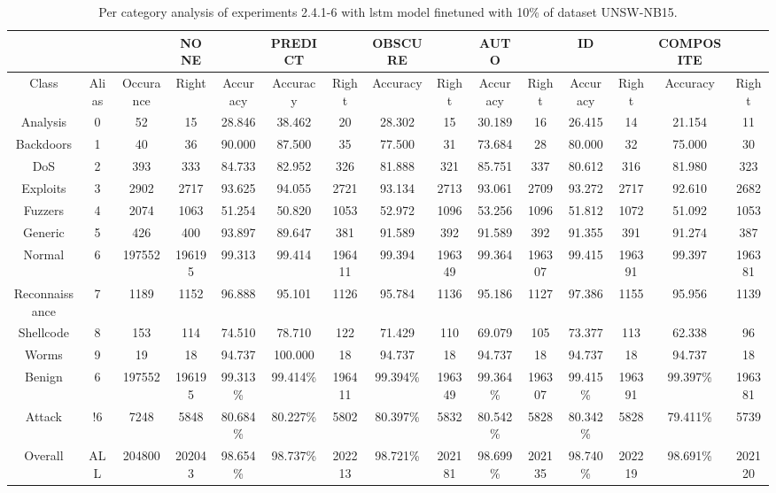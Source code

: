 \begin{table}[htb]
    \centering
    \begin{tabular}{@{}ccccccccccccccc@{}}
        \toprule
         &  &  & NONE &  & PREDICT &  & OBSCURE &  & AUTO &  & ID &  & COMPOSITE &  \\
        \midrule
        Class &  Alias &  Occurance &  Right &  Accuracy &  Accuracy &  Right &  Accuracy &  Right &  Accuracy &  Right &  Accuracy &  Right &  Accuracy &  Right \\
        Analysis &  0 &  52 &  15 &  28.846 &  38.462 &  20 &  28.302 &  15 &  30.189 &  16 &  26.415 &  14 &  21.154 &  11 \\
        Backdoors &  1 &  40 &  36 &  90.000 &  87.500 &  35 &  77.500 &  31 &  73.684 &  28 &  80.000 &  32 &  75.000 &  30 \\
        DoS &  2 &  393 &  333 &  84.733 &  82.952 &  326 &  81.888 &  321 &  85.751 &  337 &  80.612 &  316 &  81.980 &  323 \\
        Exploits &  3 &  2902 &  2717 &  93.625 &  94.055 &  2721 &  93.134 &  2713 &  93.061 &  2709 &  93.272 &  2717 &  92.610 &  2682 \\
        Fuzzers &  4 &  2074 &  1063 &  51.254 &  50.820 &  1053 &  52.972 &  1096 &  53.256 &  1096 &  51.812 &  1072 &  51.092 &  1053 \\
        Generic &  5 &  426 &  400 &  93.897 &  89.647 &  381 &  91.589 &  392 &  91.589 &  392 &  91.355 &  391 &  91.274 &  387 \\
        Normal &  6 &  197552 &  196195 &  99.313 &  99.414 &  196411 &  99.394 &  196349 &  99.364 &  196307 &  99.415 &  196391 &  99.397 &  196381 \\
        Reconnaissance &  7 &  1189 &  1152 &  96.888 &  95.101 &  1126 &  95.784 &  1136 &  95.186 &  1127 &  97.386 &  1155 &  95.956 &  1139 \\
        Shellcode &  8 &  153 &  114 &  74.510 &  78.710 &  122 &  71.429 &  110 &  69.079 &  105 &  73.377 &  113 &  62.338 &  96 \\
        Worms &  9 &  19 &  18 &  94.737 &  100.000 &  18 &  94.737 &  18 &  94.737 &  18 &  94.737 &  18 &  94.737 &  18 \\
        Benign &  6 &  197552 &  196195 &  99.313\% &  99.414\% &  196411 &  99.394\% &  196349 &  99.364\% &  196307 &  99.415\% &  196391 &  99.397\% &  196381 \\
        Attack &  !6 &  7248 &  5848 &  80.684\% &  80.227\% &  5802 &  80.397\% &  5832 &  80.542\% &  5828 &  80.342\% &  5828 &  79.411\% &  5739 \\
        Overall &  ALL &  204800 &  202043 &  98.654\% &  98.737\% &  202213 &  98.721\% &  202181 &  98.699\% &  202135 &  98.740\% &  202219 &  98.691\% &  202120 \\
        \bottomrule
    \end{tabular}
    \caption{Per category analysis of experiments 2.4.1-6 with \gls{lstm} model finetuned with 10\% of dataset UNSW-NB15.}
    \label{table:results:lstm:class_flows15_10}
\end{table}